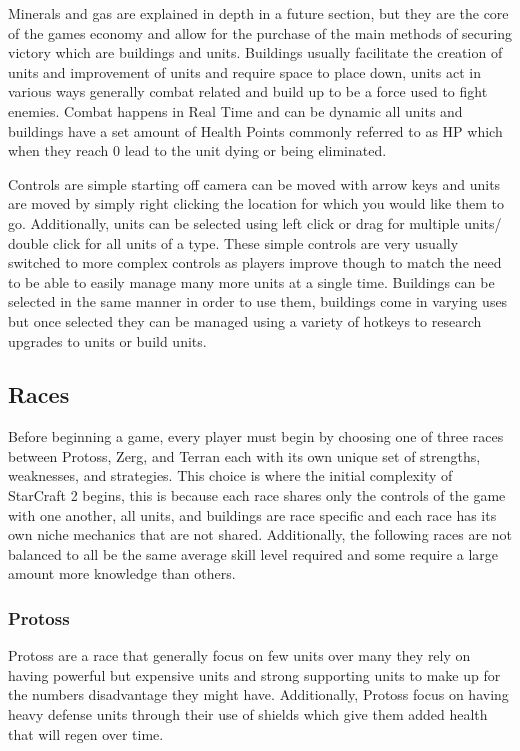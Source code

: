 \documentclass[a4paper,12pt]{report}
\begin{document}
Minerals and gas are explained in depth in a future section, but they are the core of the games economy and allow for the purchase of the main methods of securing victory which are buildings and units. Buildings usually facilitate the creation of units and improvement of units and require space to place down, units act in various ways generally combat related and build up to be a force used to fight enemies. Combat happens in Real Time and can be dynamic all units and buildings have a set amount of Health Points commonly referred to as HP which when they reach 0 lead to the unit dying or being eliminated.

Controls are simple starting off camera can be moved with arrow keys and units are moved by simply right clicking the location for which you would like them to go. Additionally, units can be selected using left click or drag for multiple units/ double click for all units of a type. These simple controls are very usually switched to more complex controls as players improve though to match the need to be able to easily manage many more units at a single time. Buildings can be selected in the same manner in order to use them, buildings come in varying uses but once selected they can be managed using a variety of hotkeys to research upgrades to units or build units.

\subsection{Races}

Before beginning a game, every player must begin by choosing one of three races between Protoss, Zerg, and Terran each with its own unique set of strengths, weaknesses, and strategies. This choice is where the initial complexity of StarCraft 2 begins, this is because each race shares only the controls of the game with one another, all units, and buildings are race specific and each race has its own niche mechanics that are not shared. Additionally, the following races are not balanced to all be the same average skill level required and some require a large amount more knowledge than others.

\subsubsection{Protoss}

Protoss are a race that generally focus on few units over many they rely on having powerful but expensive units and strong supporting units to make up for the numbers disadvantage they might have. Additionally, Protoss focus on having heavy defense units through their use of shields which give them added health that will regen over time.
\end{document}
